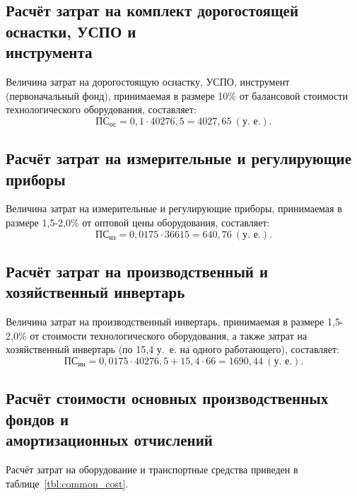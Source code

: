 \subsection{%
  Расчёт затрат на комплект дорогостоящей оснастки, УСПО и \\
  инструмента
}

Величина затрат на дорогостоящую оснастку, УСПО, 
инструмент (первоначальный фонд), принимаемая в размере 10\% от 
балансовой стоимости технологического оборудования, составляет:
\begin{equation*}
  \text{ПС}_{\text{ос}} = 0{,}1 \cdot 40276{,}5 = 4027{,}65 \: (\text{у.~е.}).
\end{equation*}

\subsection{Расчёт затрат на измерительные и
  регулирующие приборы}

Величина затрат на измерительные и регулирующие приборы,
принимаемая в размере 1{,}5-2{,}0\% от 
оптовой цены оборудования, составляет:
\begin{equation*}
  \text{ПС}_{\text{из}} = 0{,}0175 \cdot 36615 = 640{,}76 \: (\text{у.~е.}).
\end{equation*}

\subsection{Расчёт затрат на производственный и
  хозяйственный инвертарь}

Величина затрат на производственный инвертарь,
принимаемая в размере 1{,}5-2{,}0\% от 
стоимости технологического оборудования, а также 
затрат на хозяйственный инвертарь 
(по 15{,}4 у.~е. на одного работающего), составляет:
\begin{equation*}
  \text{ПС}_{\text{ин}} = 
  0{,}0175 \cdot 40276{,}5 + 15{,}4 \cdot 66 = 1690{,}44 \: (\text{у.~е.}).
\end{equation*}

\subsection{Расчёт стоимости основных производственных фондов и \\
амортизационных отчислений}

Расчёт затрат на оборудование и транспортные средства
приведен в таблице~\ref{tbl:common_cost}.

